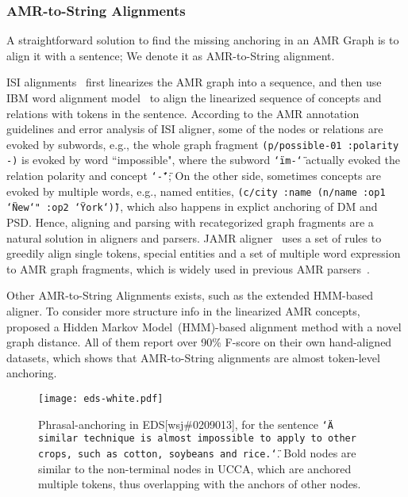 \subsubsection{AMR-to-String Alignments}
\label{sssec:lex:amr2string-align}

A straightforward solution to find the missing anchoring in an AMR Graph is to align it with a
sentence; We denote it as AMR-to-String alignment.

ISI alignments~\cite{Pourdamghani:2014aligning} first linearizes the
AMR graph into a sequence, and then use IBM word alignment
model~\cite{brown1993mathematics} to align the linearized sequence of
concepts and relations with tokens in the sentence. According to the
AMR annotation guidelines and error analysis of ISI aligner, some of
the nodes or relations are evoked by subwords, e.g., the whole graph
fragment \texttt{(p/possible-01 :polarity -)} is evoked by word
``impossible", where the subword \texttt{\char`\"im-\char`\"} actually
evoked the relation polarity and concept \texttt{\char`\"-\char`\"};
On the other side, sometimes concepts are evoked by multiple words,
e.g., named entities, \texttt{(c/city :name (n/name :op1
  \char`\"New\char`" :op2 \char`\"York\char`\"))}, which also happens
in explict anchoring of DM and PSD. Hence, aligning and parsing with
recategorized graph fragments are a natural solution in aligners and
parsers. JAMR aligner~\cite{Flanigan:2014vc} uses a set of rules to
greedily align single tokens, special entities and a set of multiple
word expression to AMR graph fragments, which is widely used in
previous AMR
parsers~\cite[\eg][]{Flanigan:2014vc,Wang:2015uo,Artzi:2009tb,Pust:2015ug,Peng:2015tj,Konstas:2017uj,Wang:2017vt}.

Other AMR-to-String Alignments exists, such as the extended HMM-based
aligner. To consider more structure info in the linearized AMR
concepts, \citet{Wang:2017vt} proposed a Hidden Markov
Model~(HMM)-based alignment method with a novel graph distance. All of
them report over 90\% F-score on their own hand-aligned datasets,
which shows that AMR-to-String alignments are almost token-level
anchoring.

\begin{figure}[t]
\centering
\texttt{[image: eds-white.pdf]}
\caption{\label{fig:phrasal-anchoring}Phrasal-anchoring in
  EDS[wsj\#0209013], for the sentence \texttt{\char`\"A similar
    technique is almost impossible to apply to other crops, such as
    cotton, soybeans and rice.\char`\"}. Bold nodes are similar to the
  non-terminal nodes in UCCA, which are anchored multiple tokens, thus
  overlapping with the anchors of other nodes.}
\end{figure}

